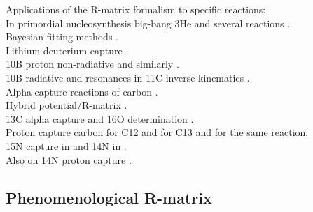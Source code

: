 \documentclass[openany]{book}
\begin{document}
Applications of the R-matrix formalism to specific reactions: \\

In primordial nucleosynthesis \cite{desouza_iliadis_coc_2019} big-bang 3He and several reactions \cite{sparta_pizzone_bertulani_hou_lamia_tumino_2020}. \\

Bayesian fitting methods \cite{odell_brune_phillips_2022}. \\

Lithium deuterium capture \cite{grineviciute_lamia_mukhamedzhanov_spitaleri_lacognata_2015}. \\

10B proton non-radiative \cite{kolk_macon_deboer_anderson_boeltzig_brandenburg_brune_chen_clark_danley_et_2022} and similarly \cite{sieverding_randhawa_zetterberg_deboer_ahn_mancino_martinez-pinedo_hix_2022}. \\

10B radiative and resonances in 11C inverse kinematics \cite{kaur_guimaraes_zamora_assuncao_alcantara-nunez_delara_zevallos_ribeiro_lichtenthaler_pires_et_2022}. \\

Alpha capture reactions of carbon \cite{schurmann_gialanella_kunz_strieder_2012}.  \\

 Hybrid potential/R-matrix \cite{sparenberg_2005}. \\

 13C alpha capture and 16O determination \cite{prusachenko_bobrovsky_bondarenko_bokhovko_gurbich_ketlerov_2022}. \\

Proton capture carbon \cite{burtebaev_igamov_peterson_yarmukhamedov_zazulin_2008} for C12 and \cite{chakraborty_deboer_mukherjee_roy_2015} for C13 and \cite{genard_descouvemont_terwagne_2010} for the same reaction. \\

15N capture in \cite{barker_2008} and 14N in \cite{angulo_champagne_trautvetter_2005}.  \\

Also on 14N proton capture \cite{formicola_imbriani_costantini_angulo_bemmerer_bonetti_broggini_corvisiero_cruz_descouvemont_et_2004}. \\

\subsection{Phenomenological R-matrix} \label{sub:rmatrix_phenomenological}
\end{document}

